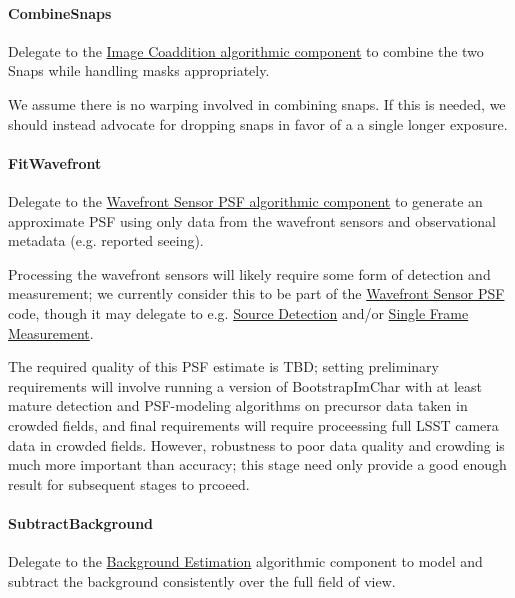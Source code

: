 \paragraph{CombineSnaps}
\label{sec:drpBootstrapImChar_CombineSnaps}

Delegate to the \hyperref[sec:acCoaddition]{Image Coaddition algorithmic component} to combine the two Snaps while handling masks appropriately.

We assume there is no warping involved in combining snaps.  If this is needed, we should instead advocate for dropping snaps in favor of a a single longer exposure.

\paragraph{FitWavefront}
\label{sec:drpBootstrapImChar_FitWavefront}

Delegate to the \hyperref[sec:acWavefrontSensorPSF]{Wavefront Sensor PSF algorithmic component} to generate an approximate PSF using only data from the wavefront sensors and observational metadata (e.g. reported seeing).

Processing the wavefront sensors will likely require some form of detection and measurement; we currently consider this to be part of the \hyperref[sec:acWavefrontSensorPSF]{Wavefront Sensor PSF} code, though it may delegate to e.g. \hyperref[sec:acSourceDetection]{Source Detection} and/or \hyperref[sec:acSingleFrameMeasurement]{Single Frame Measurement}.

The required quality of this PSF estimate is TBD; setting preliminary requirements will involve running a version of BootstrapImChar with at least mature detection and PSF-modeling algorithms on precursor data taken in crowded fields, and final requirements will require proceessing full LSST camera data in crowded fields.  However, robustness to poor data quality and crowding is much more important than accuracy; this stage need only provide a good enough result for subsequent stages to prcoeed.

\paragraph{SubtractBackground}
\label{sec:drpBootstrapImChar_SubtractBackground}

Delegate to the \hyperref[sec:acBackgroundEstimation]{Background Estimation} algorithmic component to model and subtract the background consistently over the full field of view.

